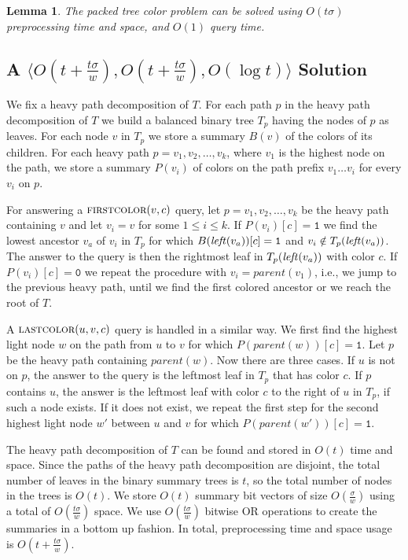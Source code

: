 \documentclass[11pt]{article}
\newcommand{\tree}{\ensuremath{T}}
\newcommand{\fca}{\ensuremath{\textsc{firstcolor}}}
\newcommand{\lca}{\ensuremath{\textsc{lastcolor}}}
\newcommand{\leftc}{\ensuremath{\text{\textit{left}}}}
\newtheorem{lemma}{Lemma}
\begin{document}
\begin{lemma}
The packed tree color problem can be solved using $O(t\sigma)$ preprocessing time and space, and $O(1)$ query time.
\end{lemma}


\subsection{A $\langle O(t+\frac{t\sigma}{w}),O(t+\frac{t\sigma}{w}),O(\log t) \rangle$ Solution}




We fix a heavy path decomposition of $\tree$. For each path $p$ in the heavy path decomposition of $\tree$ we build a balanced binary tree $\tree_p$ having the nodes of $p$ as leaves. For each node $v$ in $\tree_p$ we store a summary $B(v)$ of the colors of its children. For each heavy path $p=v_1,v_2,\ldots,v_k$, where $v_1$ is the highest node on the path, we store a summary $P(v_i)$ of colors on the path prefix $v_1\ldots v_i$ for every $v_i$ on $p$. 

For answering a $\fca(v,c)$ query, let $p=v_1,v_2,\ldots,v_k$ be the heavy path containing $v$ and let $v_i=v$ for some $1\leq i \leq k$. If $P(v_i)[c]=\mathtt{1}$ we find the lowest ancestor $v_a$ of $v_i$ in $\tree_p$ for which $B(\leftc(v_a))[c]=\mathtt{1}$ and $v_i\notin \tree_p(\leftc(v_a))$. The answer to the query is then the rightmost leaf in $\tree_p(\leftc(v_a))$ with color $c$. If $P(v_i)[c]=\mathtt{0}$ we repeat the procedure with $v_i=parent(v_1)$, i.e., we jump to the previous heavy path, until we find the first colored ancestor or we reach the root of $\tree$.

A $\lca(u,v,c)$ query is handled in a similar way. We first find the highest light node $w$ on the path from $u$ to $v$ for which $P(parent(w))[c]=\mathtt{1}$. Let $p$ be the heavy path containing $parent(w)$. Now there are three cases. If $u$ is not on $p$, the answer to the query is the leftmost leaf in $T_p$ that has color $c$. If $p$ contains $u$, the answer is the leftmost leaf with color $c$ to the right of $u$ in $\tree_p$, if such a node exists. If it does not exist, we repeat the first step for the second highest light node $w'$ between $u$ and $v$ for which $P(parent(w'))[c]=\mathtt{1}$.

The heavy path decomposition of $\tree$ can be found and stored in $O(t)$ time and space. Since the paths of the heavy path decomposition are disjoint, the total number of leaves in the binary summary trees is $t$, so the total number of nodes in the trees is $O(t)$. We store $O(t)$ summary bit vectors of size $O(\frac{\sigma}{w})$ using a total of $O(\frac{t\sigma}{w})$ space. We use $O(\frac{t\sigma}{w})$ bitwise OR operations to create the summaries in a bottom up fashion. In total, preprocessing time and space usage is $O(t+\frac{t\sigma}{w})$.
\end{document}
